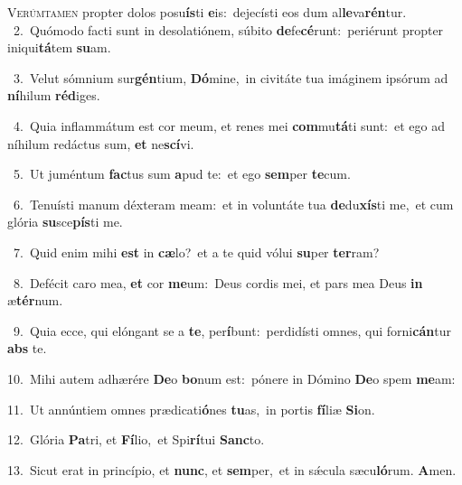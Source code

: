 \lettrine{\initial\textcolor{\initialcolor}{V}}{erúmtamen} propter dolos posu\-\textbf{ís}\-ti \textbf{e}\-is:~\star dejecísti eos dum al\-\textbf{le}\-va\-\textbf{rén}\-tur.\\
{\numbfont\textcolor{\numbcolor}{~2.}}~Quómodo facti sunt in desolatiónem, súbito \textbf{de}\-fe\-\textbf{cé}\-runt:~\star periérunt propter iniqui\-\textbf{tá}\-tem \textbf{su}\-am.\par
{\numbfont\textcolor{\numbcolor}{~3.}}~Velut sómnium sur\-\textbf{gén}\-tium, \textbf{Dó}\-mine,~\star in civitáte tua imáginem ipsórum ad \textbf{ní}\-hilum \textbf{réd}\-iges.\par
{\numbfont\textcolor{\numbcolor}{~4.}}~Quia inflammátum est cor meum, et renes mei \textbf{com}\-mu\-\textbf{tá}\-ti sunt:~\star et ego ad níhilum redáctus sum, \textbf{et} ne\-\textbf{scí}\-vi.\par
{\numbfont\textcolor{\numbcolor}{~5.}}~Ut juméntum \textbf{fac}\-tus sum \textbf{a}\-pud te:~\star et ego \textbf{sem}\-per \textbf{te}\-cum.\par
{\numbfont\textcolor{\numbcolor}{~6.}}~Tenuísti manum déxteram meam:~\dagger et in voluntáte tua \textbf{de}\-du\-\textbf{xís}\-ti me,~\star et cum glória \textbf{su}\-sce\-\textbf{pís}\-ti me.\par
{\numbfont\textcolor{\numbcolor}{~7.}}~Quid enim mihi \textbf{est} in \textbf{cæ}\-lo?~\star et a te quid vólui \textbf{su}\-per \textbf{ter}\-ram?\par
{\numbfont\textcolor{\numbcolor}{~8.}}~Defécit caro mea, \textbf{et} cor \textbf{me}\-um:~\star Deus cordis mei, et pars mea Deus \textbf{in} æ\-\textbf{tér}\-num.\par
{\numbfont\textcolor{\numbcolor}{~9.}}~Quia ecce, qui elóngant se a \textbf{te}\-, per\-\textbf{í}\-bunt:~\star perdidísti omnes, qui forni\-\textbf{cán}\-tur \textbf{abs} te.\par
{\numbfont\textcolor{\numbcolor}{10.}}~Mihi autem adhærére \textbf{De}\-o \textbf{bo}\-num est:~\star pónere in Dómino \textbf{De}\-o spem \textbf{me}\-am:\par
{\numbfont\textcolor{\numbcolor}{11.}}~Ut annúntiem omnes prædicati\-\textbf{ó}\-nes \textbf{tu}\-as,~\star in portis \textbf{fí}\-liæ \textbf{Si}\-on.\par
{\numbfont\textcolor{\numbcolor}{12.}}~Glória \textbf{Pa}\-tri, et \textbf{Fí}\-lio,~\star et Spi\-\textbf{rí}\-tui \textbf{Sanc}\-to.\par
{\numbfont\textcolor{\numbcolor}{13.}}~Sicut erat in princípio, et \textbf{nunc}\-, et \textbf{sem}\-per,~\star et in sǽcula sæcu\-\textbf{ló}\-rum. \textbf{A}\-men.\par
